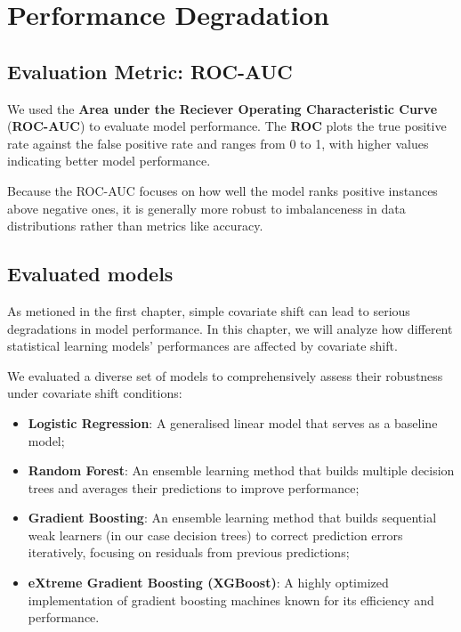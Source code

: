 \chapter{Performance Degradation}

\vspace{-0.3em}

\section{Evaluation Metric: ROC-AUC}

We used the \textbf{Area under the Reciever Operating Characteristic Curve} (\textbf{ROC-AUC}) to evaluate model performance. The \textbf{ROC} plots the true positive rate against the false positive rate and ranges from 0 to 1, with higher values indicating better model performance.

Because the ROC-AUC focuses on how well the model ranks positive instances above negative ones, it is generally more robust to imbalanceness in data distributions rather than metrics like accuracy.

\vspace{-0.3em}

\section{Evaluated models}

As metioned in the first chapter, simple covariate shift can lead to serious degradations in model performance. In this chapter, we will analyze how different statistical learning models' performances are affected by covariate shift. 

We evaluated a diverse set of models to comprehensively assess their robustness under covariate shift conditions:

\begin{itemize}
    \item \textbf{Logistic Regression}: A generalised linear model that serves as a baseline model;
    \item \textbf{Random Forest}: An ensemble learning method that builds multiple decision trees and averages their predictions to improve performance;
    \item \textbf{Gradient Boosting}: An ensemble learning method that builds sequential weak learners (in our case decision trees) to correct prediction errors iteratively, focusing on residuals from previous predictions;
    \item \textbf{eXtreme Gradient Boosting (XGBoost)}: A highly optimized implementation of gradient boosting machines known for its efficiency and performance.
\end{itemize}

